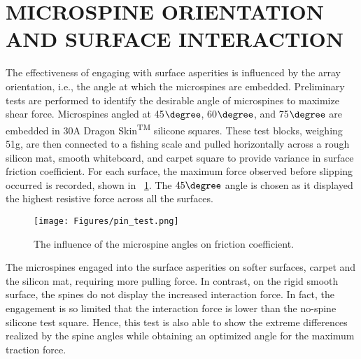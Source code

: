 \section{MICROSPINE ORIENTATION AND SURFACE INTERACTION}
\label{Sec:Microspine}
The effectiveness of engaging with surface asperities is influenced by the array orientation, i.e., the angle at which the microspines are embedded. Preliminary tests are performed to identify the desirable angle of microspines to maximize shear force. Microspines angled at 45$\degree$, 60$\degree$, and 75$\degree$ are embedded in 30A Dragon Skin\textsuperscript{TM} silicone squares. These test blocks, weighing 51g,  are then connected to a fishing scale and pulled horizontally across a rough silicon mat, smooth whiteboard, and carpet square to provide variance in surface friction coefficient. For each surface, the maximum force observed before slipping occurred is recorded, shown in \Fig~\ref{fig:Pin Test}. The $45\degree$ angle is chosen as it displayed the highest resistive force across all the surfaces.

\begin{figure}[h]
    \centering
    \texttt{[image: Figures/pin\_test.png]}
    \caption{The influence of the microspine angles on friction coefficient.}
    \label{fig:Pin Test}
\end{figure}

The microspines engaged into the surface asperities on softer surfaces, carpet and the silicon mat, requiring more pulling force. In contrast, on the rigid smooth surface, the spines do not display the increased interaction force. In fact, the engagement is so limited that the interaction force is lower than the no-spine silicone test square. Hence, this test is also able to show the extreme differences realized by the spine angles while obtaining an optimized angle for the maximum traction force.
